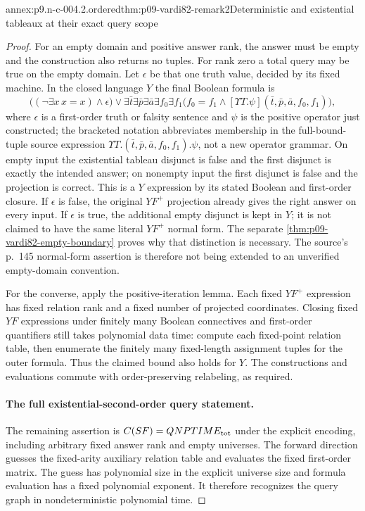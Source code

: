 \begin{annexitem}{annex:p9.n-c-004.2.ordered}{thm:p09-vardi82-remark2}{Deterministic and existential tableaux at their exact query scope}
\begin{proof}
For an empty domain and positive answer rank, the answer must be empty and
the construction also returns no tuples.  For rank zero a total query may
be true on the empty domain.  Let \(\epsilon\) be that one truth value,
decided by its fixed machine.  In the closed language \(Y\) the final
Boolean formula is
\[
 \bigl((\neg\exists x\,x=x)\land\epsilon\bigr)
 \lor \exists\bar t\exists\bar p\exists\bar a\exists f_0\exists f_1
   \bigl(f_0=f_1\land
      [\Upsilon T.\psi](\bar t,\bar p,\bar a,f_0,f_1)\bigr),
\]
where \(\epsilon\) is a first-order truth or falsity sentence and
\(\psi\) is the positive operator just constructed; the bracketed notation
abbreviates membership in the full-bound-tuple source expression
\(\Upsilon T.(\bar t,\bar p,\bar a,f_0,f_1).\psi\), not a new operator grammar.
On empty input the
existential tableau disjunct is false and the first disjunct is exactly
the intended answer; on nonempty input the first disjunct is false and
the projection is correct.  This is a \(Y\) expression by its stated Boolean and first-order
closure. If \(\epsilon\) is false, the original \(YF^+\) projection
already gives the right answer on every input. If \(\epsilon\) is true,
the additional empty disjunct is kept in \(Y\); it is not claimed to
have the same literal \(YF^+\) normal form. The separate
\cref{thm:p09-vardi82-empty-boundary} proves why that distinction is
necessary. The source's p.~145 normal-form assertion is therefore not
being extended to an unverified empty-domain convention.

For the converse, apply the positive-iteration lemma.
Each fixed \(YF^+\) expression has fixed relation rank and a fixed
number of projected coordinates. Closing fixed \(YF\) expressions
under finitely many Boolean connectives and first-order quantifiers still
takes polynomial data time: compute each fixed-point relation table, then
enumerate the finitely many fixed-length assignment tuples for the outer
formula. Thus the claimed bound also holds for \(Y\). The constructions
and evaluations commute with order-preserving relabeling, as required.

\paragraph{The full existential-second-order query statement.}
The remaining assertion is \(C(SF)=QNPTIME_{\rm tot}\) under the
explicit encoding, including arbitrary fixed answer rank and empty
universes. The forward direction guesses the fixed-arity auxiliary
relation table and evaluates the fixed first-order matrix. The guess has
polynomial size in the explicit universe size and formula evaluation has
a fixed polynomial exponent. It therefore recognizes the query graph in
nondeterministic polynomial time.


\end{proof}
\end{annexitem}

